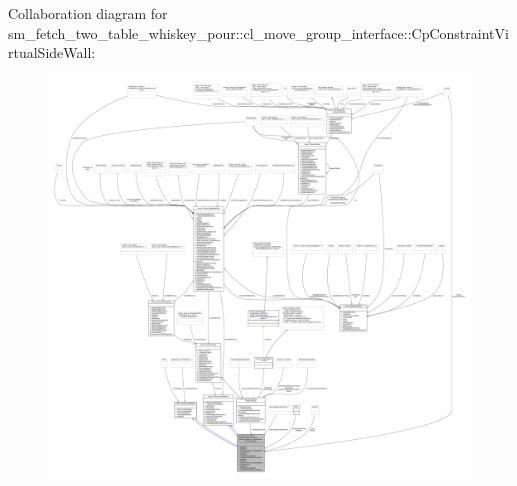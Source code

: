 Collaboration diagram for sm\+\_\+fetch\+\_\+two\+\_\+table\+\_\+whiskey\+\_\+pour\+:\+:cl\+\_\+move\+\_\+group\+\_\+interface\+:\+:Cp\+Constraint\+Virtual\+Side\+Wall\+:
\nopagebreak
\begin{figure}[H]
\begin{center}
\leavevmode
\includegraphics[width=350pt]{classsm__fetch__two__table__whiskey__pour_1_1cl__move__group__interface_1_1CpConstraintVirtualSideWall__coll__graph}
\end{center}
\end{figure}
